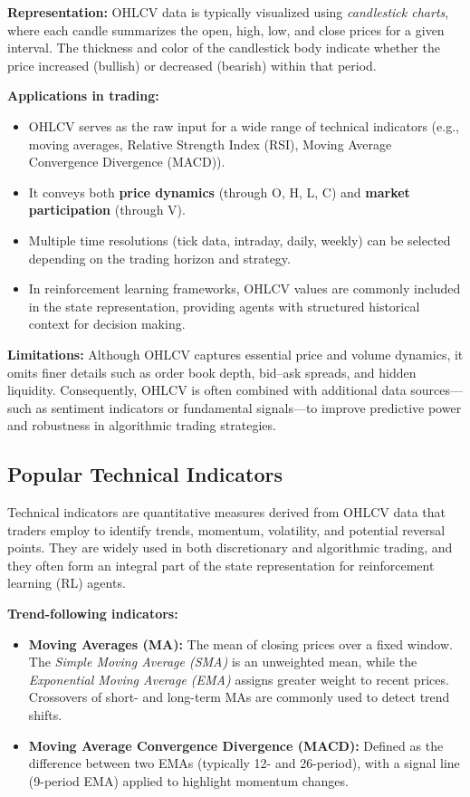 \documentclass[12pt,a4paper]{report}
\begin{document}
\bigskip
\textbf{Representation:}  
OHLCV data is typically visualized using \textit{candlestick charts}, where each candle summarizes the open, high, low, and close prices for a given interval. The thickness and color of the candlestick body indicate whether the price increased (bullish) or decreased (bearish) within that period.



\bigskip
\textbf{Applications in trading:}  
\begin{itemize}
    \item OHLCV serves as the raw input for a wide range of technical indicators (e.g., moving averages, Relative Strength Index (RSI), Moving Average Convergence Divergence (MACD)).
    \item It conveys both \textbf{price dynamics} (through O, H, L, C) and \textbf{market participation} (through V).
    \item Multiple time resolutions (tick data, intraday, daily, weekly) can be selected depending on the trading horizon and strategy.
    \item In reinforcement learning frameworks, OHLCV values are commonly included in the state representation, providing agents with structured historical context for decision making.
\end{itemize}

\bigskip
\textbf{Limitations:}  
Although OHLCV captures essential price and volume dynamics, it omits finer details such as order book depth, bid–ask spreads, and hidden liquidity. Consequently, OHLCV is often combined with additional data sources—such as sentiment indicators or fundamental signals—to improve predictive power and robustness in algorithmic trading strategies.



\subsection{Popular Technical Indicators}

Technical indicators are quantitative measures derived from OHLCV data that traders employ to identify trends, momentum, volatility, and potential reversal points. They are widely used in both discretionary and algorithmic trading, and they often form an integral part of the state representation for reinforcement learning (RL) agents.

\bigskip
\textbf{Trend-following indicators:}
\begin{itemize}
    \item \textbf{Moving Averages (MA):} The mean of closing prices over a fixed window. The \textit{Simple Moving Average (SMA)} is an unweighted mean, while the \textit{Exponential Moving Average (EMA)} assigns greater weight to recent prices. Crossovers of short- and long-term MAs are commonly used to detect trend shifts.
    \item \textbf{Moving Average Convergence Divergence (MACD):} Defined as the difference between two EMAs (typically 12- and 26-period), with a signal line (9-period EMA) applied to highlight momentum changes.
\end{itemize}
\end{document}
